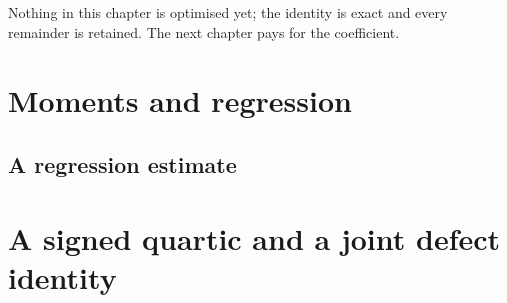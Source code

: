 Nothing in this chapter is optimised yet; the identity is exact and every
remainder is retained. The next chapter pays for the coefficient.

\section{Moments and regression}\label{sec-moments}


\subsection{A regression estimate}


\section{A signed quartic and a joint defect identity}\label{sec-quartic}


